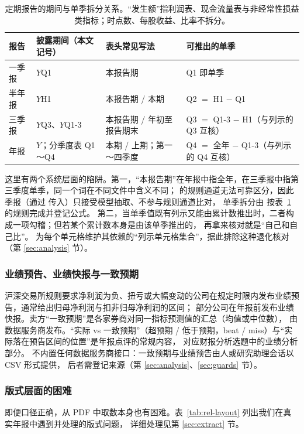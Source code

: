 \begin{table}[h]
\centering
\caption{定期报告的期间与单季拆分关系。“发生额”指利润表、现金流量表与非经常性损益类指标；时点数、每股收益、比率不拆分。}
\label{tab:rel-periods}
\small
\begin{tabular}{@{}llll@{}}
\toprule
报告 & 披露期间（本文记号） & 表头常见写法 & 可推出的单季 \\
\midrule
一季报 & $Y$Q1 & 本报告期 & Q1 即单季 \\
半年报 & $Y$H1 & 本报告期 / 本期 & Q2 $=$ H1 $-$ Q1 \\
三季报 & $Y$Q3、$Y$Q1-3 & 本报告期 / 年初至报告期末 & Q3 $=$ Q1-3 $-$ H1（与列示的 Q3 互核） \\
年报 & $Y$；分季度表 Q1～Q4 & 本期 / 上期；第一～四季度 & Q4 $=$ 全年 $-$ Q1-3（与列示的 Q4 互核） \\
\bottomrule
\end{tabular}
\end{table}

这里有两个系统层面的陷阱。第一，“本报告期”在年报中指全年，在三季报中指第三季度单季，同一个词在不同文件中含义不同；
\sysname{} 的规则通道无法可靠区分，因此季报（通过  传入）只接受模型抽取、不参与规则通道比对，
单季拆分由  按表~\ref{tab:rel-periods} 的规则完成并登记公式。
第二，当单季值既有列示又能由累计数推出时，二者构成一项勾稽；但若某个累计数本身是由该单季推出的，
再拿来核对就是“自己和自己比”。 为每个单元格维护其依赖的“列示单元格集合”，据此排除这种退化核对
（第 \ref{sec:analysis} 节）。

\subsubsection{业绩预告、业绩快报与一致预期}
沪深交易所规则要求净利润为负、扭亏或大幅变动的公司在规定时限内发布业绩预告，通常给出归母净利润与扣非归母净利润的区间；
部分公司在年报前发布业绩快报。卖方“一致预期”是各家券商对同一指标预测值的汇总（均值或中位数），
由数据服务商发布。“实际 vs 一致预期”（超预期 / 低于预期，beat / miss）与“实际落在预告区间的位置”是年报点评的常规内容，
对应财报分析选题中的业绩分析部分。\sysname{} 不内置任何数据服务商接口：一致预期与业绩预告由人或研究助理会话以 CSV 形式提供，
后者需登记来源（第 \ref{sec:analysis}、\ref{sec:guards} 节）。

\subsubsection{版式层面的困难}
即便口径正确，从 PDF 中取数本身也有困难。表~\ref{tab:rel-layout} 列出我们在真实年报中遇到并处理的版式问题，
详细处理见第 \ref{sec:extract} 节。

